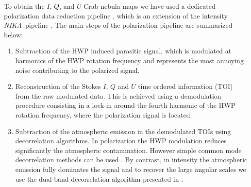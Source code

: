 \documentclass[twocolumn,traditabstract]{aa}
\def\NIKA{\textit{NIKA}}
\begin{document}
To obtain the $I$, $Q$, and $U$ Crab nebula maps we have used a dedicated polarization data reduction pipeline \citep{ritacco2017}, which is an extension of the intensity \NIKA\ pipeline \citep{catalano2014,adam2013}. The main steps of the polarization pipeline are summarized below:
\begin{enumerate}
\item  Subtraction of the HWP induced parasitic signal, which is modulated at harmonics of the HWP rotation frequency and represents the most annoying noise contributing to the polarized signal. 
\item Reconstruction of the Stokes $I$, $Q$ and $U$ time ordered information (TOI) from the raw modulated data. This is achieved using a demodulation procedure consisting in a lock-in around the fourth harmonic of the HWP rotation frequency, where the polarization signal is located.
\item Subtraction of the atmospheric emission in the demodulated TOIs using decorrelation algorithms. In polarization the HWP modulation reduces significantly the atmospheric contamination. However simple common mode decorrelation methods can be used \citep{ritacco2017}. By contrast, in intensity the atmospheric emission fully dominates the signal and to recover the large angular scales we use the dual-band decorrelation algorithm presented in \cite{adam2013}.



\end{enumerate}
\end{document}
